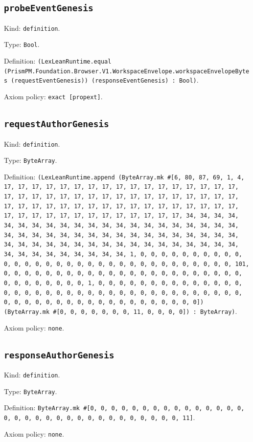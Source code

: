 \documentclass[11pt]{article}
\begin{document}
\subsection*{\texttt{probeEventGenesis}}
\noindent Kind: \texttt{definition}.\par
\noindent Type: \texttt{Bool}.\par
\noindent Definition: \texttt{(LexLeanRuntime.equal (PrismPM.Foundation.Browser.V1.WorkspaceEnvelope.workspaceEnvelopeBytes (requestEventGenesis)) (responseEventGenesis) : Bool)}.\par
\noindent Axiom policy: \texttt{exact [propext]}.\par
\subsection*{\texttt{requestAuthorGenesis}}
\noindent Kind: \texttt{definition}.\par
\noindent Type: \texttt{ByteArray}.\par
\noindent Definition: \texttt{(LexLeanRuntime.append (ByteArray.mk \#[6, 80, 87, 69, 1, 4, 17, 17, 17, 17, 17, 17, 17, 17, 17, 17, 17, 17, 17, 17, 17, 17, 17, 17, 17, 17, 17, 17, 17, 17, 17, 17, 17, 17, 17, 17, 17, 17, 17, 17, 17, 17, 17, 17, 17, 17, 17, 17, 17, 17, 17, 17, 17, 17, 17, 17, 17, 17, 17, 17, 17, 17, 17, 17, 17, 17, 17, 17, 17, 17, 34, 34, 34, 34, 34, 34, 34, 34, 34, 34, 34, 34, 34, 34, 34, 34, 34, 34, 34, 34, 34, 34, 34, 34, 34, 34, 34, 34, 34, 34, 34, 34, 34, 34, 34, 34, 34, 34, 34, 34, 34, 34, 34, 34, 34, 34, 34, 34, 34, 34, 34, 34, 34, 34, 34, 34, 34, 34, 34, 34, 34, 34, 34, 34, 1, 0, 0, 0, 0, 0, 0, 0, 0, 0, 0, 0, 0, 0, 0, 0, 0, 0, 0, 0, 0, 0, 0, 0, 0, 0, 0, 0, 0, 0, 0, 0, 0, 101, 0, 0, 0, 0, 0, 0, 0, 0, 0, 0, 0, 0, 0, 0, 0, 0, 0, 0, 0, 0, 0, 0, 0, 0, 0, 0, 0, 0, 0, 0, 0, 1, 0, 0, 0, 0, 0, 0, 0, 0, 0, 0, 0, 0, 0, 0, 0, 0, 0, 0, 0, 0, 0, 0, 0, 0, 0, 0, 0, 0, 0, 0, 0, 0, 0, 0, 0, 0, 0, 0, 0, 0, 0, 0, 0, 0, 0, 0, 0, 0, 0, 0, 0, 0, 0, 0, 0, 0]) (ByteArray.mk \#[0, 0, 0, 0, 0, 0, 0, 11, 0, 0, 0, 0]) : ByteArray)}.\par
\noindent Axiom policy: \texttt{none}.\par
\subsection*{\texttt{responseAuthorGenesis}}
\noindent Kind: \texttt{definition}.\par
\noindent Type: \texttt{ByteArray}.\par
\noindent Definition: \texttt{ByteArray.mk \#[0, 0, 0, 0, 0, 0, 0, 0, 0, 0, 0, 0, 0, 0, 0, 0, 0, 0, 0, 0, 0, 0, 0, 0, 0, 0, 0, 0, 0, 0, 0, 0, 11]}.\par
\noindent Axiom policy: \texttt{none}.\par
\end{document}
